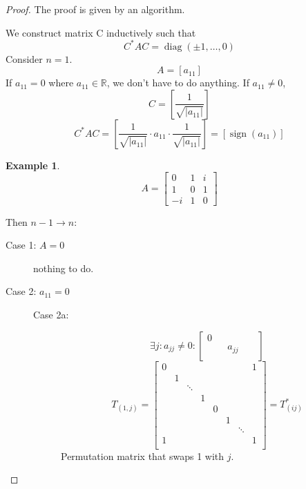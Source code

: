 \documentclass{article}
\newtheorem{example}{Example}  \numberwithin{example}{section}
\newcommand{\card}[1]{\left|#1\right|}
\begin{document}
\begin{proof}
  The proof is given by an algorithm.

  We construct matrix C inductively such that
  \[ C^* A C = \operatorname{diag}(\pm 1, \dots, 0) \]
  Consider $n = 1$.
  \[ A = [a_{11}] \]
  If $a_{11} = 0$ where $a_{11} \in \mathbb R$, we don't have to do anything.
  If $a_{11} \neq 0$,
  \[ C = \left[\frac{1}{\sqrt{\card{a_{11}}}}\right] \]
  \[ C^* AC = \left[\frac{1}{\sqrt{\card{a_{11}}}} \cdot a_{11} \cdot \frac{1}{\sqrt{\card{a_{11}}}}\right] = \left[\operatorname{sign}(a_{11})\right] \]

  \begin{example} %
    \label{ex825}
    \[
      A = \begin{bmatrix}
        0 & 1 & i \\
        1 & 0 & 1 \\
        -i & 1 & 0
      \end{bmatrix}
    \]
  \end{example}

  Then $n-1 \to n$:
  \begin{description}
    \item[Case 1: $A = 0$] nothing to do.
    \item[Case 2: $a_{11} = 0$]
      \begin{description}
        \item[Case 2a:] 
          \[
            \exists j: a_{jj} \neq 0:
            \begin{bmatrix}
              0 & & & & \\
                & & a_{jj} & & \\
            \end{bmatrix}
          \]
          \[
            T_{(1,j)} = \begin{bmatrix}
              0 &   & & & & & & 1 \\
                & 1 & & & & & & \\
                &   & \ddots & & & & & \\
                &   &    & 1 & & & & \\
                &   &    & & 0 & & & \\
                &   &    & &   & 1 & & \\
                &   &    & &   &  & \ddots & \\
              1 &   &    & &   &  &  & 1 \\
            \end{bmatrix}
            = T^*_{(ij)}
          \]
          Permutation matrix that swaps 1 with $j$.


\end{description}
\end{description}
\end{proof}
\end{document}
